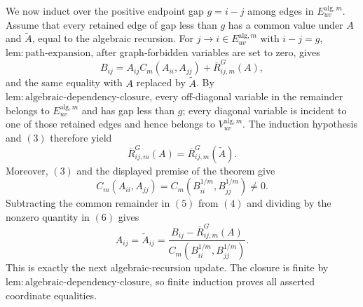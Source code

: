 We now induct over the positive endpoint gap \(g=i-j\) among edges in \(E_{uv}^{\mathrm{alg},m}\).  Assume that every retained edge of gap less than \(g\) has a common value under \(A\) and \(\widetilde A\), equal to the algebraic recursion.  For \(j\to i\in E_{uv}^{\mathrm{alg},m}\) with \(i-j=g\), \(\mathrm{lem{:}path\mbox{-}expansion}\), after graph-forbidden variables are set to zero, gives
\[
 B_{ij}
 =A_{ij}C_m(A_{ii},A_{jj})+\overline R^{G}_{ij,m}(A),
\tag{4}
\]
and the same equality with \(A\) replaced by \(\widetilde A\).  By \(\mathrm{lem{:}algebraic\mbox{-}dependency\mbox{-}closure}\), every off-diagonal variable in the remainder belongs to \(E_{uv}^{\mathrm{alg},m}\) and has gap less than \(g\); every diagonal variable is incident to one of those retained edges and hence belongs to \(V_{uv}^{\mathrm{alg},m}\).  The induction hypothesis and \((3)\) therefore yield
\[
 \overline R^{G}_{ij,m}(A)
 =\overline R^{G}_{ij,m}(\widetilde A).
\tag{5}
\]
Moreover, \((3)\) and the displayed premise of the theorem give
\[
 C_m(A_{ii},A_{jj})
 =C_m(B_{ii}^{1/m},B_{jj}^{1/m})\ne0.
\tag{6}
\]
Subtracting the common remainder in \((5)\) from \((4)\) and dividing by the nonzero quantity in \((6)\) gives
\[
 A_{ij}=\widetilde A_{ij}
 =\frac{B_{ij}-\overline R^{G}_{ij,m}(A)}
 {C_m(B_{ii}^{1/m},B_{jj}^{1/m})}.
\tag{7}
\]
This is exactly the next algebraic-recursion update.  The closure is finite by \(\mathrm{lem{:}algebraic\mbox{-}dependency\mbox{-}closure}\), so finite induction proves all asserted coordinate equalities.

